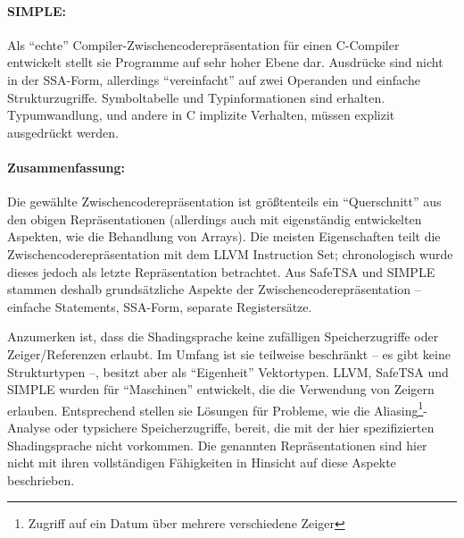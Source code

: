 \documentclass[twoside,a4paper,fleqn,12pt]{book}
\begin{document}

\paragraph{SIMPLE:} Als "`echte"' Compiler-Zwischencoderepräsentation für einen C-Compiler entwickelt
stellt sie Programme auf sehr hoher Ebene dar. Ausdrücke sind nicht in der SSA-Form, allerdings
"`vereinfacht"' auf zwei Operanden und einfache Strukturzugriffe. Symboltabelle und Typinformationen
sind erhalten. Typumwandlung, und andere in C implizite Verhalten, müssen explizit ausgedrückt werden.


\paragraph{Zusammenfassung:}
Die gewählte Zwischencoderepräsentation ist größtenteils ein "`Querschnitt"' aus den obigen Repräsentationen
(allerdings auch mit eigenständig entwickelten Aspekten, wie die Behandlung von Arrays).
Die meisten Eigenschaften
teilt die Zwischencoderepräsentation mit dem LLVM Instruction Set; chronologisch wurde dieses jedoch als letzte
Repräsentation betrachtet. Aus SafeTSA und SIMPLE stammen deshalb grundsätzliche Aspekte der Zwischencoderepräsentation 
-- einfache Statements, SSA-Form, separate Registersätze.

Anzumerken ist, dass die Shadingsprache keine zufälligen Speicherzugriffe oder Zeiger/Referenzen erlaubt.
Im Umfang ist sie teilweise beschränkt -- es gibt keine Strukturtypen --, besitzt aber als "`Eigenheit"' Vektortypen.
LLVM, SafeTSA und SIMPLE wurden für "`Maschinen"' entwickelt, die die Verwendung von Zeigern erlauben. Entsprechend
stellen sie Lösungen für Probleme, wie die Aliasing\footnote{Zugriff auf ein Datum über mehrere verschiedene Zeiger}-Analyse
oder typsichere Speicherzugriffe, bereit, die mit der hier spezifizierten Shadingsprache nicht vorkommen. Die genannten Repräsentationen sind hier nicht
mit ihren vollständigen Fähigkeiten in Hinsicht auf diese Aspekte beschrieben.
\end{document}
